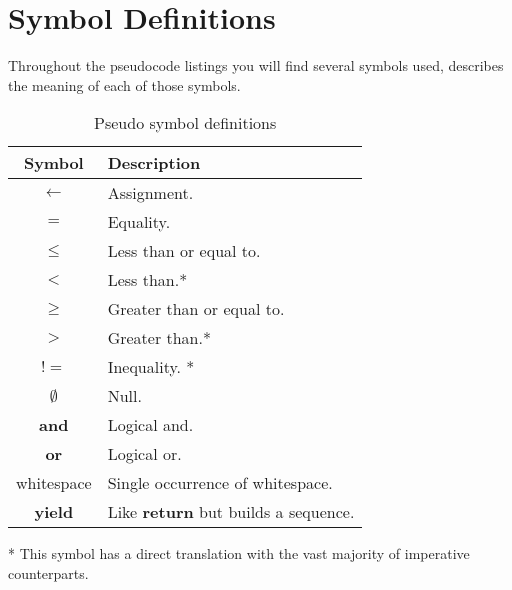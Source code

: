 \chapter{Symbol Definitions}
Throughout the pseudocode listings you will find several symbols used,  describes the meaning of each of those symbols.

\begin{table}[h]
\begin{center}
\begin{tabular}[t]{|c|l|}
\hline
\textbf{Symbol} & \textbf{Description} \\
\hline
$\leftarrow$ & Assignment. \\
\hline
$=$ & Equality. \\
\hline
$\leq$ & Less than or equal to.  \\
\hline
$<$ & Less than.* \\
\hline
$\geq$ & Greater than or equal to.  \\
\hline
$>$ & Greater than.* \\
\hline
$!=$ & Inequality. * \\
\hline
$\emptyset$ & Null. \\
\hline
\textbf{and} & Logical and.  \\
\hline
\textbf{or} & Logical or.  \\ 
\hline
whitespace & Single occurrence of whitespace. \\
\hline
\textbf{yield} & Like \textbf{return} but builds a sequence. \\
\hline
\end{tabular}
\end{center}
\caption{Pseudo symbol definitions}
\end{table}

* This symbol has a direct translation with the vast majority of imperative counterparts.
